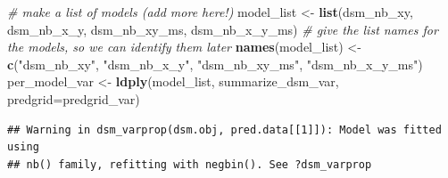 \documentclass[]{book}
\newenvironment{Shaded}{\begin{snugshade}}{\end{snugshade}}
\newcommand{\KeywordTok}[1]{\textcolor[rgb]{0.13,0.29,0.53}{\textbf{#1}}}
\newcommand{\DataTypeTok}[1]{\textcolor[rgb]{0.13,0.29,0.53}{#1}}
\newcommand{\StringTok}[1]{\textcolor[rgb]{0.31,0.60,0.02}{#1}}
\newcommand{\CommentTok}[1]{\textcolor[rgb]{0.56,0.35,0.01}{\textit{#1}}}
\newcommand{\NormalTok}[1]{#1}
\theoremstyle{definition}
\theoremstyle{definition}
\theoremstyle{remark}
\begin{document}
\begin{Shaded}
\begin{Highlighting}[]
\CommentTok{# make a list of models (add more here!)}
\NormalTok{model_list <-}\StringTok{ }\KeywordTok{list}\NormalTok{(dsm_nb_xy, dsm_nb_x_y, dsm_nb_xy_ms, dsm_nb_x_y_ms)}
\CommentTok{# give the list names for the models, so we can identify them later}
\KeywordTok{names}\NormalTok{(model_list) <-}\StringTok{ }\KeywordTok{c}\NormalTok{(}\StringTok{"dsm_nb_xy"}\NormalTok{, }\StringTok{"dsm_nb_x_y"}\NormalTok{, }\StringTok{"dsm_nb_xy_ms"}\NormalTok{, }\StringTok{"dsm_nb_x_y_ms"}\NormalTok{)}
\NormalTok{per_model_var <-}\StringTok{ }\KeywordTok{ldply}\NormalTok{(model_list, summarize_dsm_var, }\DataTypeTok{predgrid=}\NormalTok{predgrid_var)}
\end{Highlighting}
\end{Shaded}

\begin{verbatim}
## Warning in dsm_varprop(dsm.obj, pred.data[[1]]): Model was fitted using
## nb() family, refitting with negbin(). See ?dsm_varprop
\end{verbatim}
\end{document}

